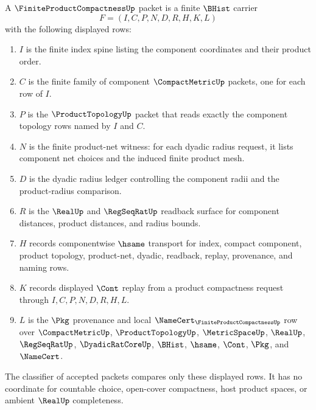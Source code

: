 \begin{definition}
\label{def:finite-product-compactness-packet}
A $\FiniteProductCompactnessUp$ packet is a finite $\BHist$ carrier
$$
F=(I,C,P,N,D,R,H,K,L)
$$
with the following displayed rows:
\begin{enumerate}
\item $I$ is the finite index spine listing the component coordinates and their product order.
\item $C$ is the finite family of component $\CompactMetricUp$ packets, one for each row of $I$.
\item $P$ is the $\ProductTopologyUp$ packet that reads exactly the component topology rows named by $I$ and $C$.
\item $N$ is the finite product-net witness: for each dyadic radius request, it lists component net choices and the induced finite product mesh.
\item $D$ is the dyadic radius ledger controlling the component radii and the product-radius comparison.
\item $R$ is the $\RealUp$ and $\RegSeqRatUp$ readback surface for component distances, product distances, and radius bounds.
\item $H$ records componentwise $\hsame$ transport for index, compact component, product topology, product-net, dyadic, readback, replay, provenance, and naming rows.
\item $K$ records displayed $\Cont$ replay from a product compactness request through $I,C,P,N,D,R,H,L$.
\item $L$ is the $\Pkg$ provenance and local $\NameCert_{\FiniteProductCompactnessUp}$ row over $\CompactMetricUp$, $\ProductTopologyUp$, $\MetricSpaceUp$, $\RealUp$, $\RegSeqRatUp$, $\DyadicRatCoreUp$, $\BHist$, $\hsame$, $\Cont$, $\Pkg$, and $\NameCert$.
\end{enumerate}
The classifier of accepted packets compares only these displayed rows. It has no coordinate for countable choice, open-cover compactness, host product spaces, or ambient $\RealUp$ completeness.
\end{definition}

